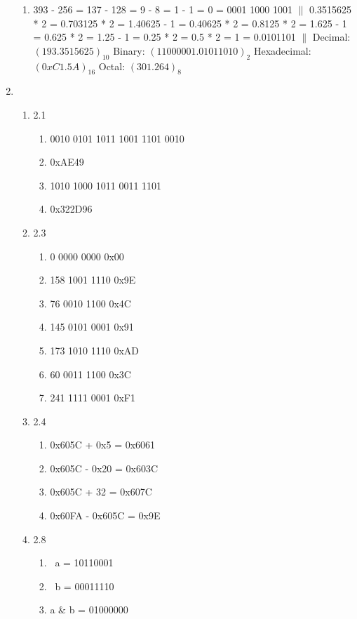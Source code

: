 \documentclass[11pt]{article}
\begin{document}
\begin{enumerate}
\begin{enumerate}
        \item 393 - 256 = 137 - 128 = 9 - 8 = 1 - 1 = 0 = 0001 1000 1001 $\|$ 0.3515625 * 2 = 0.703125 * 2 = 1.40625 - 1 = 0.40625 * 2 = 0.8125 * 2 = 1.625 - 1 = 0.625 * 2 = 1.25 - 1 = 0.25 * 2 = 0.5 * 2 = 1 = 0.0101101 $\|$ \newline Decimal: $(193.3515625)_{10}$ Binary: $(11000001.01011010)_2$ Hexadecimal: $(0xC1.5A)_{16}$ Octal: $(301.264)_8$
    \end{enumerate}
    \item \begin{enumerate}
        \item 2.1
        \begin{enumerate}
            \item 0010 0101 1011 1001 1101 0010
            \item 0xAE49
            \item 1010 1000 1011 0011 1101
            \item 0x322D96
        \end{enumerate}
        \item 2.3
        \begin{enumerate}
            \item 0 0000 0000 0x00
            \item 158 1001 1110 0x9E
            \item 76 0010 1100 0x4C
            \item 145 0101 0001 0x91
            \item 173 1010 1110 0xAD
            \item 60 0011 1100 0x3C
            \item 241 1111 0001 0xF1
        \end{enumerate}
        \item 2.4
        \begin{enumerate}
            \item 0x605C + 0x5 = 0x6061
            \item 0x605C - 0x20 = 0x603C
            \item 0x605C + 32 = 0x607C
            \item 0x60FA - 0x605C = 0x9E
        \end{enumerate}
        \item 2.8
        \begin{enumerate}
            \item ~a = 10110001
            \item ~b = 00011110
            \item a $\&$ b = 01000000

\end{enumerate}
\end{enumerate}
\end{enumerate}
\end{document}

